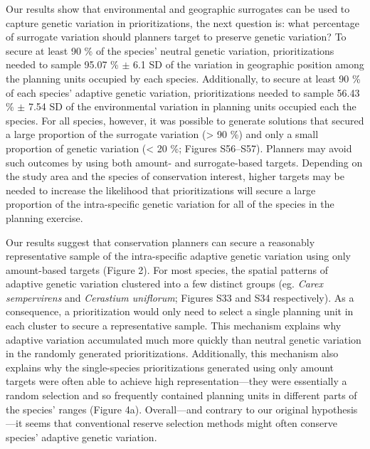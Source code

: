\documentclass[9pt,twocolumn,twoside,lineno]{pnas-new}
\begin{document}
Our results show that environmental and geographic surrogates can be
used to capture genetic variation in prioritizations, the next question
is: what percentage of surrogate variation should planners target to
preserve genetic variation? To secure at least 90 \% of the species'
neutral genetic variation, prioritizations needed to sample 95.07 \%
\(\pm\) 6.1 SD of the variation in geographic position among the
planning units occupied by each species. Additionally, to secure at
least 90 \% of each species' adaptive genetic variation, prioritizations
needed to sample 56.43 \% \(\pm\) 7.54 SD of the environmental variation
in planning units occupied each the species. For all species, however,
it was possible to generate solutions that secured a large proportion of
the surrogate variation (\textgreater{} 90 \%) and only a small
proportion of genetic variation (\textless{} 20 \%; Figures S56--S57).
Planners may avoid such outcomes by using both amount- and
surrogate-based targets. Depending on the study area and the species of
conservation interest, higher targets may be needed to increase the
likelihood that prioritizations will secure a large proportion of the
intra-specific genetic variation for all of the species in the planning
exercise.

Our results suggest that conservation planners can secure a reasonably
representative sample of the intra-specific adaptive genetic variation
using only amount-based targets (Figure 2). For most species, the
spatial patterns of adaptive genetic variation clustered into a few
distinct groups (eg. \emph{Carex sempervirens} and \emph{Cerastium
uniflorum}; Figures S33 and S34 respectively). As a consequence, a
prioritization would only need to select a single planning unit in each
cluster to secure a representative sample. This mechanism explains why
adaptive variation accumulated much more quickly than neutral genetic
variation in the randomly generated prioritizations. Additionally, this
mechanism also explains why the single-species prioritizations generated
using only amount targets were often able to achieve high
representation---they were essentially a random selection and so
frequently contained planning units in different parts of the species'
ranges (Figure 4a). Overall---and contrary to our original
hypothesis---it seems that conventional reserve selection methods might
often conserve species' adaptive genetic variation.
\end{document}
